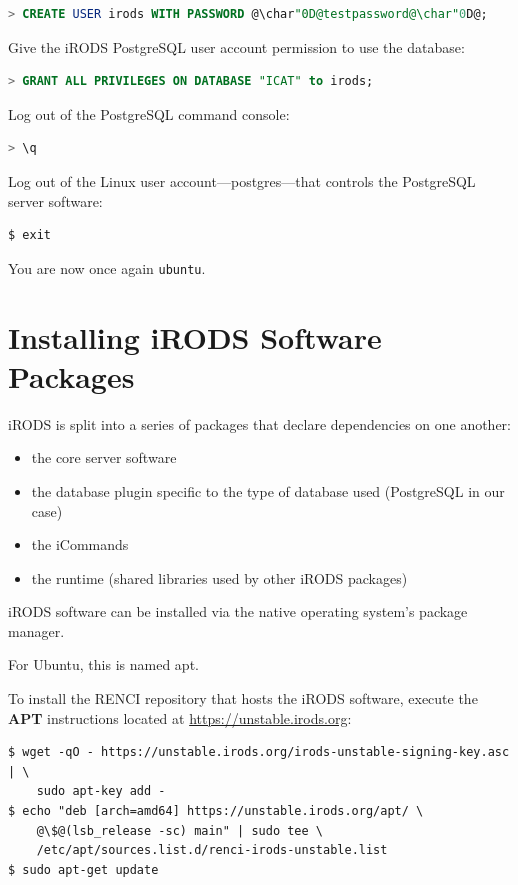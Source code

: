 \documentclass[10pt,oneside]{memoir}
\begin{document}
\begin{lstlisting}[language=sql]
  > CREATE USER irods WITH PASSWORD @\char"0D@testpassword@\char"0D@;
\end{lstlisting}

Give the iRODS PostgreSQL user account permission to use the database:

\begin{lstlisting}[language=sql]
> GRANT ALL PRIVILEGES ON DATABASE "ICAT" to irods;
\end{lstlisting}

Log out of the PostgreSQL command console:

\begin{lstlisting}[language=sql]
> \q
\end{lstlisting}

Log out of the Linux user account---postgres---that controls the PostgreSQL server software:

\begin{lstlisting}
$ exit
\end{lstlisting}

You are now once again \texttt{ubuntu}.

\section{Installing iRODS Software Packages}
iRODS is split into a series of packages that declare dependencies on one another:
\begin{itemize}
 \item the core server software
 \item the database plugin specific to the type of database used (PostgreSQL in our case)
 \item the iCommands
 \item the runtime (shared libraries used by other iRODS packages)
\end{itemize}

iRODS software can be installed via the native operating system's package manager.

For Ubuntu, this is named apt.

To install the RENCI repository that hosts the iRODS software, execute the \textbf{APT} instructions located at \url{https://unstable.irods.org}:

\begin{lstlisting}
$ wget -qO - https://unstable.irods.org/irods-unstable-signing-key.asc | \
	sudo apt-key add -
$ echo "deb [arch=amd64] https://unstable.irods.org/apt/ \
	@\$@(lsb_release -sc) main" | sudo tee \
	/etc/apt/sources.list.d/renci-irods-unstable.list
$ sudo apt-get update
\end{lstlisting}
\end{document}
